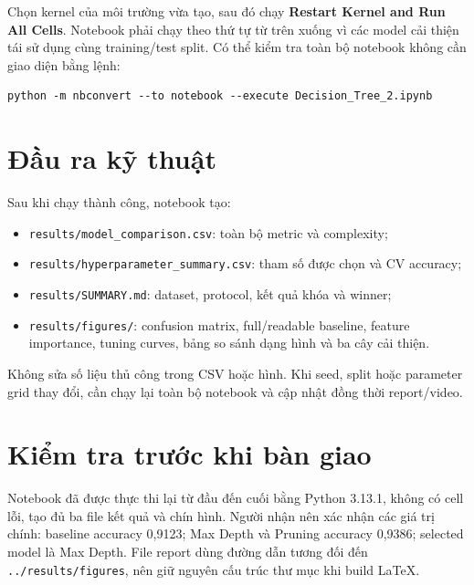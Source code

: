 Chọn kernel của môi trường vừa tạo, sau đó chạy \textbf{Restart Kernel and Run
All Cells}. Notebook phải chạy theo thứ tự từ trên xuống vì các model cải thiện
tái sử dụng cùng training/test split. Có thể kiểm tra toàn bộ notebook không cần
giao diện bằng lệnh:

\begin{verbatim}
python -m nbconvert --to notebook --execute Decision_Tree_2.ipynb
\end{verbatim}

\section{Đầu ra kỹ thuật}

Sau khi chạy thành công, notebook tạo:

\begin{itemize}
  \item \texttt{results/model\_comparison.csv}: toàn bộ metric và complexity;
  \item \texttt{results/hyperparameter\_summary.csv}: tham số được chọn và CV
  accuracy;
  \item \texttt{results/SUMMARY.md}: dataset, protocol, kết quả khóa và winner;
  \item \texttt{results/figures/}: confusion matrix, full/readable baseline,
  feature importance, tuning curves, bảng so sánh dạng hình và ba cây cải thiện.
\end{itemize}

Không sửa số liệu thủ công trong CSV hoặc hình. Khi seed, split hoặc parameter
grid thay đổi, cần chạy lại toàn bộ notebook và cập nhật đồng thời report/video.

\section{Kiểm tra trước khi bàn giao}

Notebook đã được thực thi lại từ đầu đến cuối bằng Python 3.13.1, không có cell
lỗi, tạo đủ ba file kết quả và chín hình. Người nhận nên xác nhận các giá trị
chính: baseline accuracy 0,9123; Max Depth và Pruning accuracy 0,9386; selected
model là Max Depth. File report dùng đường dẫn tương đối đến
\texttt{../results/figures}, nên giữ nguyên cấu trúc thư mục khi build LaTeX.
